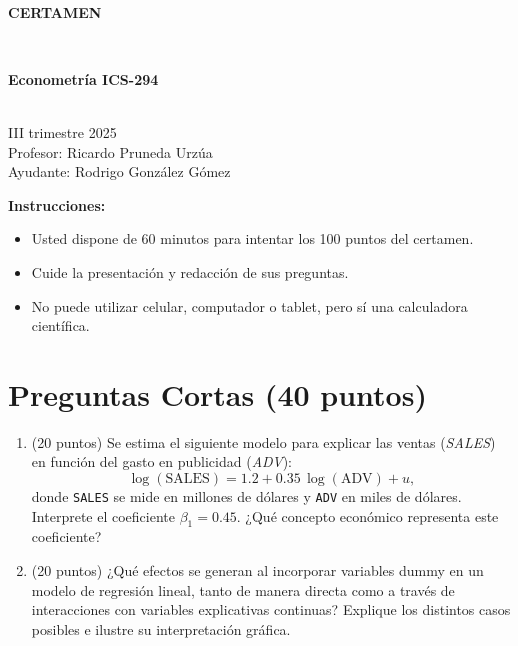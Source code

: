 \documentclass[10pt,a4paper]{article}
\begin{document}
\vspace{5cm}



\begin{center}
\begin{large}
\textbf{\\CERTAMEN}
\end{large}\\
\end{center}

\begin{center}
\begin{large}
\textbf{Econometría ICS-294}
\end{large}\\
\vspace{0.2cm}
III trimestre 2025\\
Profesor: Ricardo Pruneda Urzúa\\
Ayudante: Rodrigo González Gómez\\
\end{center}

\textbf{Instrucciones:} 

\begin{itemize}

    \item Usted dispone de 60 minutos  para intentar los 100 puntos del certamen.
    \item Cuide la presentación y redacción de sus preguntas.
    \item No puede utilizar celular, computador o tablet, pero sí una calculadora científica.
     
\end{itemize}

\section{Preguntas Cortas (40 puntos)}

\begin{enumerate}
    \item (20 puntos) Se estima el siguiente modelo para explicar las ventas (\emph{SALES})
        en función del gasto en publicidad (\emph{ADV}):
        \[
          \log(\text{SALES})
          = 1.2 + 0.35\,\log(\text{ADV}) + u ,
        \]
        donde \texttt{SALES} se mide en millones de dólares y \texttt{ADV}
        en miles de dólares. Interprete el coeficiente \(\beta_1 = 0.45\). ¿Qué concepto económico representa este coeficiente?\\

\item  (20 puntos) ¿Qué efectos se generan al incorporar variables dummy en un modelo de regresión lineal, tanto de manera directa como a través de interacciones con variables explicativas continuas? 
Explique los distintos casos posibles e ilustre su interpretación gráfica.

\end{enumerate}
\end{document}
